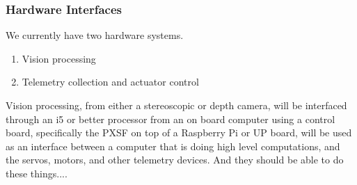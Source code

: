 \documentclass[compsoc,draftclsnofoot,onecolumn,10pt]{IEEEtran}
\begin{document}
\subsubsection{Hardware Interfaces} %
We currently have two hardware systems.
\begin{enumerate}
	\item Vision processing
	\item Telemetry collection and actuator control
\end{enumerate}

Vision processing, from either a stereoscopic or depth camera, will be interfaced through 
an i5 or better processor from an on board computer using a control board, specifically 
the PXSF on top of a Raspberry Pi or UP board, will be used as an interface between a 
computer that is doing high level computations, and the servos, motors, and other telemetry 
devices. 
And they should be able to do these things....

\end{document}
